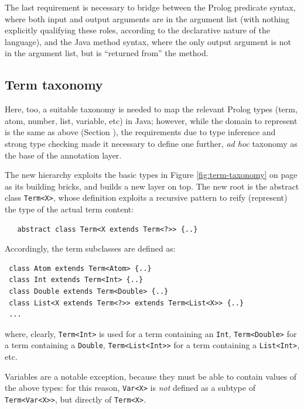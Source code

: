 \noindent The last requirement is necessary to bridge between the Prolog predicate syntax, where both input and output arguments are in the argument list (with nothing explicitly qualifying these roles, according to the declarative nature of the language), and the Java method syntax, where the only output argument is not in the argument list, but is ``returned from'' the method.

\subsection{Term taxonomy}
\label{ssec:p@j-term-taxonomy}

Here, too, a suitable taxonomy is needed to map the relevant Prolog types (term, atom, number, list, variable, etc) in Java; however, while the domain to represent is the same as above (Section \label{ssec:java-api-types}), the requirements due to type inference and strong type checking made it necessary to define one further, \textit{ad hoc} taxonomy as the base of the annotation layer.

The new hierarchy exploits the basic types in Figure \ref{fig:term-taxonomy} on page \pageref{fig:term-taxonomy} as its building bricks, and builds a new layer on top.
The new root is the abstract class \texttt{Term<X>}, whose definition exploits a recursive pattern to reify (represent) the type of the actual term content:

\begin{verbatim}
   abstract class Term<X extends Term<?>> {..}
\end{verbatim}

\noindent Accordingly, the term subclasses are defined as:

\begin{verbatim}
 class Atom extends Term<Atom> {..}
 class Int extends Term<Int> {..}
 class Double extends Term<Double> {..}
 class List<X extends Term<?>> extends Term<List<X>> {..}
 ...
\end{verbatim}

\noindent where, clearly, \texttt{Term<Int>} is used for a term containing an \texttt{Int}, \texttt{Term<Double>} for a term containing a \texttt{Double}, \texttt{Term<List<Int>>} for a term containing a \texttt{List<Int>}, etc.

Variables are a notable exception, because they must be able to contain values of the above types: for this reason, \texttt{Var<X>} is \textit{not} defined as a subtype of \texttt{Term<Var<X>>}, but directly of \texttt{Term<X>}.

